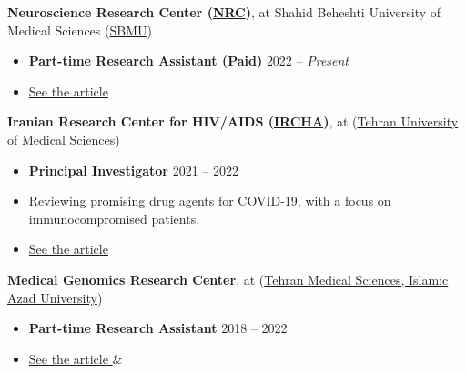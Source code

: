 \documentclass[letterpaper,11pt]{article} %
\begin{document}
\textbf{\hypertarget{NRC}{Neuroscience Research Center} (\href{http://en.nrc.sbmu.ac.ir/}{NRC})}, at Shahid Beheshti University of Medical Sciences (\href{https://en.sbmu.ac.ir/}{SBMU})
\vspace{-0.5\baselineskip}
\begin{itemize}
\item \textbf{Part-time Research Assistant (Paid)} \hfill \footnotesize{2022 -- \textit{Present}} \normalsize
\item \hyperlink{art3}{See the article \faArrowAltCircleDown[regular]}
\end{itemize}

\textbf{Iranian Research Center for HIV/AIDS (\href{https://ircha.tums.ac.ir/home_eng}{IRCHA})}, at (\href{http://en.tums.ac.ir/en}{Tehran University of Medical Sciences})
\vspace{-0.5\baselineskip}

\begin{itemize}
\item \textbf{Principal Investigator}  \hfill \footnotesize{2021 -- 2022} \normalsize
\item Reviewing promising drug agents for COVID-19, with a focus on immunocompromised patients.
\item \hyperlink{art2}{See the article \faArrowAltCircleDown[regular]}
\end{itemize}

\textbf{Medical Genomics Research Center}, at (\href{https://tms.iau.ir/en}{Tehran Medical Sciences, Islamic Azad University})
\vspace{-0.5\baselineskip}
\begin{itemize}
\item \textbf{Part-time Research Assistant}  \hfill \footnotesize{2018 -- 2022} \normalsize
\item \hyperlink{art1}{See the article \faArrowAltCircleDown[regular]} \& \hyperlink{art6}{\faArrowAltCircleDown[regular]}
\end{itemize}

\newpage
\end{document}

